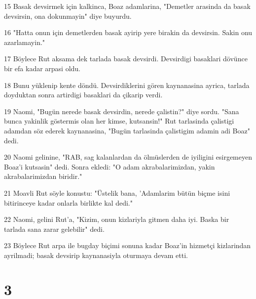 \par 15 Basak devsirmek için kalkinca, Boaz adamlarina, "Demetler arasinda da basak devsirsin, ona dokunmayin" diye buyurdu.
\par 16 "Hatta onun için demetlerden basak ayirip yere birakin da devsirsin. Sakin onu azarlamayin."
\par 17 Böylece Rut aksama dek tarlada basak devsirdi. Devsirdigi basaklari dövünce bir efa kadar arpasi oldu.
\par 18 Bunu yüklenip kente döndü. Devsirdiklerini gören kaynanasina ayrica, tarlada doyduktan sonra artirdigi basaklari da çikarip verdi.
\par 19 Naomi, "Bugün nerede basak devsirdin, nerede çalistin?" diye sordu. "Sana bunca yakinlik göstermis olan her kimse, kutsansin!" Rut tarlasinda çalistigi adamdan söz ederek kaynanasina, "Bugün tarlasinda çalistigim adamin adi Boaz" dedi.
\par 20 Naomi gelinine, "RAB, sag kalanlardan da ölmüslerden de iyiligini esirgemeyen Boaz'i kutsasin" dedi. Sonra ekledi: "O adam akrabalarimizdan, yakin akrabalarimizdan biridir."
\par 21 Moavli Rut söyle konustu: "Üstelik bana, 'Adamlarim bütün biçme isini bitirinceye kadar onlarla birlikte kal dedi."
\par 22 Naomi, gelini Rut'a, "Kizim, onun kizlariyla gitmen daha iyi. Baska bir tarlada sana zarar gelebilir" dedi.
\par 23 Böylece Rut arpa ile bugday biçimi sonuna kadar Boaz'in hizmetçi kizlarindan ayrilmadi; basak devsirip kaynanasiyla oturmaya devam etti.

\chapter{3}

